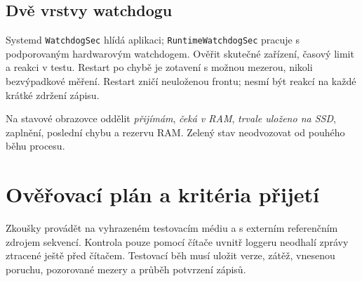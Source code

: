 \documentclass[11pt,a4paper]{article}
\newcommand{\novastrana}{\clearpage}
\begin{document}
\subsection{Dvě vrstvy watchdogu}
Systemd \texttt{WatchdogSec} hlídá aplikaci; \texttt{RuntimeWatchdogSec} pracuje s podporovaným hardwarovým watchdogem. Ověřit skutečné zařízení, časový limit a reakci v testu. Restart po chybě je zotavení s možnou mezerou, nikoli bezvýpadkové měření.\cite{service,watchdog} Restart zničí neuloženou frontu; nesmí být reakcí na každé krátké zdržení zápisu.

Na stavové obrazovce oddělit \emph{přijímám}, \emph{čeká v RAM}, \emph{trvale uloženo na SSD}, zaplnění, poslední chybu a rezervu RAM. Zelený stav neodvozovat od pouhého běhu procesu.

\novastrana
\section{Ověřovací plán a kritéria přijetí}
Zkoušky provádět na vyhrazeném testovacím médiu a s externím referenčním zdrojem sekvencí. Kontrola pouze pomocí čítače uvnitř loggeru neodhalí zprávy ztracené ještě před čítačem. Testovací běh musí uložit verze, zátěž, vnesenou poruchu, pozorované mezery a průběh potvrzení zápisů.
\end{document}
